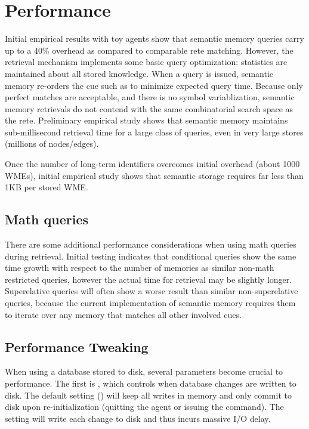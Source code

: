 \section{Performance}
\label{SMEM-perf}

Initial empirical results with toy agents show that semantic memory queries carry up to a 40\% overhead as compared to comparable rete matching.  
However, the retrieval mechanism implements some basic query optimization: statistics are maintained about all stored knowledge.  
When a query is issued, semantic memory re-orders the cue such as to minimize expected query time.  
Because only perfect matches are acceptable, and there is no symbol variablization, semantic memory retrievals do not contend with the same combinatorial search space as the rete.  
Preliminary empirical study shows that semantic memory maintains sub-millisecond retrieval time for a large class of queries, even in very large stores (millions of nodes/edges).

Once the number of long-term identifiers overcomes initial overhead (about 1000 WMEs), initial empirical study shows that semantic storage requires far less than 1KB per stored WME.

\subsection{Math queries}
There are some additional performance considerations when using math queries during retrieval.
Initial testing indicates that conditional queries show the same time growth with respect to the number of memories as similar non-math restricted queries, however the actual time for retrieval may be slightly longer.
Superelative queries will often show a worse result than similar non-superelative queries, because the current implementation of semantic memory requires them to iterate over any memory that matches all other involved cues.

\subsection{Performance Tweaking}

When using a database stored to disk, several parameters become crucial to performance.  
The first is , which controls when database changes are written to disk.   
The default setting () will keep all writes in memory and only commit to disk upon re-initialization (quitting the agent or issuing the  command).  
The  setting will write each change to disk and thus incurs massive I/O delay.

